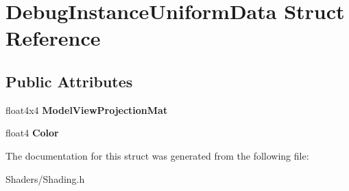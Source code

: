 \hypertarget{structDebugInstanceUniformData}{}\section{Debug\+Instance\+Uniform\+Data Struct Reference}
\label{structDebugInstanceUniformData}
\subsection*{Public Attributes}
\begin{DoxyCompactItemize}
\item 
\mbox{\label{structDebugInstanceUniformData_aaa53a25ae8a11a1fff82b2f6010178ed}} 
float4x4 {\bfseries Model\+View\+Projection\+Mat}
\item 
\mbox{\label{structDebugInstanceUniformData_ac8a706eeff4a11a9e9d4a8115562550a}} 
float4 {\bfseries Color}
\end{DoxyCompactItemize}


The documentation for this struct was generated from the following file\+:\begin{DoxyCompactItemize}
\item 
Shaders/Shading.\+h\end{DoxyCompactItemize}
